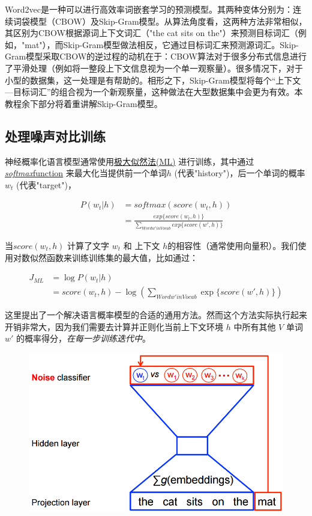 Word2vec是一种可以进行高效率词嵌套学习的预测模型。其两种变体分别为：连续词袋模型（CBOW）及Skip-Gram模型。从算法角度看，这两种方法非常相似，其区别为CBOW根据源词上下文词汇（"the cat sits on the"）来预测目标词汇（例如，"mat"），而Skip-Gram模型做法相反，它通过目标词汇来预测源词汇。Skip-Gram模型采取CBOW的逆过程的动机在于：CBOW算法对于很多分布式信息进行了平滑处理（例如将一整段上下文信息视为一个单一观察量）。很多情况下，对于小型的数据集，这一处理是有帮助的。相形之下，Skip-Gram模型将每个“上下文---目标词汇”的组合视为一个新观察量，这种做法在大型数据集中会更为有效。本教程余下部分将着重讲解Skip-Gram模型。

\subsection{处理噪声对比训练}\label{ux5904ux7406ux566aux58f0ux5bf9ux6bd4ux8badux7ec3}

神经概率化语言模型通常使用\href{https://en.wikipedia.org/wiki/Maximum_likelihood}{极大似然法(ML)} 进行训练，其中通过\href{https://en.wikipedia.org/wiki/Softmax_function}{\emph{softmax}function} 来最大化当提供前一个单词$h$ (代表"history")，后一个单词的概率$w_t$ (代表"target")，

\begin{align}
P(w_t|h) & = softmax(score(w_t,h)) \\
         & = \frac{exp\{score(w_t,h)\}}{\sum_{Word w'in Vocab}{exp\{score(w',h)\}}}
\end{align}

当$score(w_t,h)$ 计算了文字 $w_t$ 和 上下文 $h$的相容性（通常使用向量积）。我们使用对数似然函数来训练训练集的最大值，比如通过：

\begin{align}
J_{ML} & = \log{P(w_t|h)} \\
       & = score(w_t,h) - \log{(\sum_{Word w'in Vocab}{\exp{\{score(w',h)\}}})}
\end{align}

这里提出了一个解决语言概率模型的合适的通用方法。然而这个方法实际执行起来开销非常大，因为我们需要去计算并正则化当前上下文环境 $h$ 中所有其他 $V$ 单词 $w'$ 的概率得分，\emph{在每一步训练迭代中}。

\begin{figure}[htbp]
\centering
\includegraphics[width=.75\textwidth]{../SOURCE/images/nce-nplm.png}
\caption{}
\end{figure}

